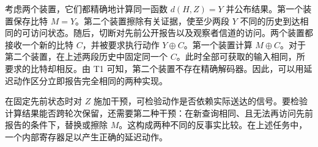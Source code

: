 考虑两个装置，它们都精确地计算同一函数 $d(H,Z)=Y$ 并公布结果。第一个装置保存比特 $M=Y$。第二个装置擦除有关证据，使至少两段 $Y$ 不同的历史到达相同的可访问状态。随后，切断对先前公开报告以及观察者信道的访问。两个装置都接收一个新的比特 $C$，并被要求执行动作 $Y\oplus C$。第一个装置计算 $M\oplus C$。对于第二个装置，在上述两段历史中固定同一个 $C$。此时全部可获取的输入相同，所要求的比特却相反。由 T1 可知，第二个装置不存在精确解码器。因此，可以用延迟动作区分立即报告完全相同的两种实现。

在固定先前状态时对 $Z$ 施加干预，可检验动作是否依赖实际送达的信号。要检验计算结果能否跨轮次保留，还需要第二种干预：在新查询相同、且无法再访问先前报告的条件下，替换或擦除 $M$。这构成两种不同的反事实比较。在上述任务中，一个内部寄存器足以产生正确的延迟动作。

